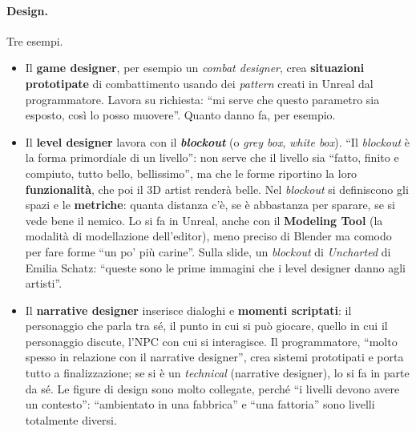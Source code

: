 \paragraph{Design.} Tre esempi.
\begin{itemize}
  \item Il \textbf{game designer}, per esempio un \emph{combat designer}, crea
        \textbf{situazioni prototipate} di combattimento usando dei \emph{pattern}
        creati in Unreal dal programmatore. Lavora su richiesta: ``mi serve che questo
        parametro sia esposto, così lo posso muovere''. Quanto danno fa, per esempio.
  \item Il \textbf{level designer} lavora con il \textbf{\emph{blockout}} (o
        \emph{grey box}, \emph{white box}). ``Il \emph{blockout} è la forma primordiale
        di un livello'': non serve che il livello sia ``fatto, finito e compiuto,
        tutto bello, bellissimo'', ma che le forme riportino la loro
        \textbf{funzionalità}, che poi il 3D artist renderà belle. Nel \emph{blockout}
        si definiscono gli spazi e le \textbf{metriche}: quanta distanza c'è, se è
        abbastanza per sparare, se si vede bene il nemico. Lo si fa in Unreal, anche con
        il \textbf{Modeling Tool} (la modalità di modellazione dell'editor), meno
        preciso di Blender ma comodo per fare forme ``un po' più carine''. Sulla slide,
        un \emph{blockout} di \emph{Uncharted} di Emilia Schatz: ``queste sono le prime
        immagini che i level designer danno agli artisti''.
  \item Il \textbf{narrative designer} inserisce dialoghi e \textbf{momenti
        scriptati}: il personaggio che parla tra sé, il punto in cui si può giocare,
        quello in cui il personaggio discute, l'NPC con cui si interagisce. Il
        programmatore, ``molto spesso in relazione con il narrative designer'', crea
        sistemi prototipati e porta tutto a finalizzazione; se si è un
        \emph{technical} (narrative designer), lo si fa in parte da sé. Le figure di
        design sono molto collegate, perché ``i livelli devono avere un contesto'':
        ``ambientato in una fabbrica'' e ``una fattoria'' sono livelli totalmente
        diversi.
\end{itemize}

